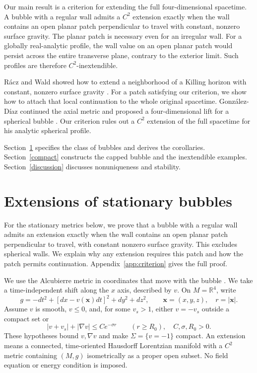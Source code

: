 \documentclass[12pt]{article}
\newcommand{\R}{\mathbb R}
\begin{document}
Our main result is a criterion for extending the full four-dimensional
spacetime. A bubble with a regular wall admits a \(C^2\) extension
exactly when the wall contains an open planar patch perpendicular to
travel with constant, nonzero surface gravity. The planar patch is
necessary even for an irregular wall. For a globally real-analytic
profile, the wall value on an open planar patch would persist across the
entire transverse plane, contrary to the exterior limit. Such profiles
are therefore \(C^2\)-inextendible.

R\'acz and Wald showed how to extend a neighborhood of a Killing horizon
with constant, nonzero surface gravity \cite{RaczWald1992,RaczWald1996}.
For a patch satisfying our criterion, we show how to attach that local
continuation to the whole original spacetime. Gonz\'alez-D\'iaz continued
the axial metric and proposed a four-dimensional lift for a spherical
bubble \cite[Sec.~II, Eqs.~(2.10)--(2.11)]{GonzalezDiaz2000}. Our criterion
rules out a \(C^2\) extension of the full spacetime for his analytic
spherical profile.

Section~\ref{extensions} specifies the class of bubbles and derives the
corollaries. Section~\ref{compact} constructs the capped bubble and the
inextendible examples. Section~\ref{discussion} discusses nonuniqueness
and stability.

\section{Extensions of stationary bubbles}
\label{extensions}

For the stationary metrics below, we prove that a bubble with a regular
wall admits an extension exactly when the wall
contains an open planar patch perpendicular to travel, with constant
nonzero surface gravity. This excludes spherical walls.
We explain why any extension requires this patch and how the patch permits
continuation.
Appendix~\ref{app:criterion} gives the full proof.

We use the Alcubierre metric in coordinates that move with the bubble
\cite[Sec.~II, Eq.~(2)]{BarceloEtAl2022}. We take a time-independent shift
along the \(x\) axis, described by \(v\).
On \(M=\R^4\), write
\begin{equation}
 g=-dt^2+[dx-v(\boldsymbol{x})dt]^2+dy^2+dz^2,
 \qquad \boldsymbol{x}=(x,y,z),\quad r=|\boldsymbol{x}|.
 \label{metric}
\end{equation}
Assume \(v\) is smooth, \(v\leq0\), and, for some \(v_s>1\), either
\(v=-v_s\) outside a compact set or
\begin{equation}
 |v+v_s|+|\nabla v|\leq Ce^{-\sigma r}\qquad(r\geq R_0),
 \quad C,\sigma,R_0>0.
 \label{tail}
\end{equation}
These hypotheses bound \(v,\nabla v\) and make
\(\Sigma=\{v=-1\}\) compact. An extension means a connected,
time-oriented Hausdorff Lorentzian manifold with a \(C^2\) metric
containing \((M,g)\) isometrically as a proper open subset.
No field equation or energy condition is imposed.
\end{document}
